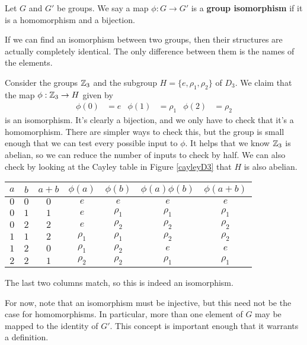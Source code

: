 \begin{definition}
Let $G$ and $G'$ be groups. We say a map $\phi: G \to G'$ is a \textbf{group isomorphism} if it is a homomorphism and a bijection.
\end{definition}

If we can find an isomorphism between two groups, then their structures are actually completely identical. The only difference between them is the names of the elements.

\begin{example}
Consider the groups $\zn[3]$ and the subgroup $H = \{e, \rho_1, \rho_2\}$ of $D_3$. We claim that the map $\phi: \zn[3] \to H$ given by
\begin{align*}
    \phi(0) &= e & \phi(1) &= \rho_1 & \phi(2) &= \rho_2
\end{align*}
is an isomorphism. It's clearly a bijection, and we only have to check that it's a homomorphism. There are simpler ways to check this, but the group is small enough that we can test every possible input to $\phi$. It helps that we know $\zn[3]$ is abelian, so we can reduce the number of inputs to check by half. We can also check by looking at the Cayley table in Figure \ref{cayleyD3} that $H$ is also abelian.

\begin{center}
    \begin{tabular}{c c c c c c c}
        $a$ & $b$ & $a+b$ & $\phi(a)$ & $\phi(b)$ & $\phi(a)\phi(b)$ & $\phi(a+b)$ \\
        \hline
        $0$ & $0$ & $0$   & $e$       & $e$       & $e$              & $e$        \\
        $0$ & $1$ & $1$   & $e$       & $\rho_1$  & $\rho_1$         & $\rho_1$   \\
        $0$ & $2$ & $2$   & $e$       & $\rho_2$  & $\rho_2$         & $\rho_2$   \\
        $1$ & $1$ & $2$   & $\rho_1$  & $\rho_1$  & $\rho_2$         & $\rho_2$   \\
        $1$ & $2$ & $0$   & $\rho_1$  & $\rho_2$  & $e$              & $e$        \\
        $2$ & $2$ & $1$   & $\rho_2$  & $\rho_2$  & $\rho_1$         & $\rho_1$
    \end{tabular}
\end{center}

The last two columns match, so this is indeed an isomorphism.
\end{example}

For now, note that an isomorphism must be injective, but this need not be the case for homomorphisms. In particular, more than one element of $G$ may be mapped to the identity of $G'$. This concept is important enough that it warrants a definition.

